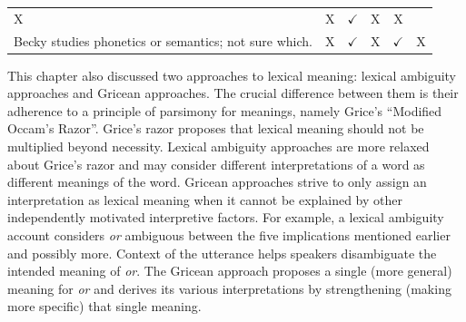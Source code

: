 \documentclass[oneside]{report}
\theoremstyle{definition}
\theoremstyle{definition}
\theoremstyle{definition}
\theoremstyle{remark}
\begin{document}
\begin{longtable}[]{@{}lccccc@{}}
\begin{minipage}[t]{0.05\columnwidth}
X\strut
\end{minipage} & \begin{minipage}[t]{0.05\columnwidth}\centering\strut
X\strut
\end{minipage} & \begin{minipage}[t]{0.05\columnwidth}\centering\strut
\(\checkmark\)\strut
\end{minipage} & \begin{minipage}[t]{0.09\columnwidth}\centering\strut
X\strut
\end{minipage} & \begin{minipage}[t]{0.12\columnwidth}\centering\strut
X\strut
\end{minipage}\tabularnewline
\begin{minipage}[t]{0.47\columnwidth}\raggedright\strut
Becky studies phonetics or semantics; not sure which.\strut
\end{minipage} & \begin{minipage}[t]{0.05\columnwidth}\centering\strut
X\strut
\end{minipage} & \begin{minipage}[t]{0.05\columnwidth}\centering\strut
\(\checkmark\)\strut
\end{minipage} & \begin{minipage}[t]{0.05\columnwidth}\centering\strut
X\strut
\end{minipage} & \begin{minipage}[t]{0.09\columnwidth}\centering\strut
\(\checkmark\)\strut
\end{minipage} & \begin{minipage}[t]{0.12\columnwidth}\centering\strut
X\strut
\end{minipage}\tabularnewline
\bottomrule
\end{longtable}
This chapter also discussed two approaches to lexical meaning: lexical
ambiguity approaches and Gricean approaches. The crucial difference
between them is their adherence to a principle of parsimony for
meanings, namely Grice's ``Modified Occam's Razor''. Grice's razor
proposes that lexical meaning should not be multiplied beyond necessity.
Lexical ambiguity approaches are more relaxed about Grice's razor and
may consider different interpretations of a word as different meanings
of the word. Gricean approaches strive to only assign an interpretation
as lexical meaning when it cannot be explained by other independently
motivated interpretive factors. For example, a lexical ambiguity account
considers \emph{or} ambiguous between the five implications mentioned
earlier and possibly more. Context of the utterance helps speakers
disambiguate the intended meaning of \emph{or}. The Gricean approach
proposes a single (more general) meaning for \emph{or} and derives its
various interpretations by strengthening (making more specific) that
single meaning.
\end{document}
